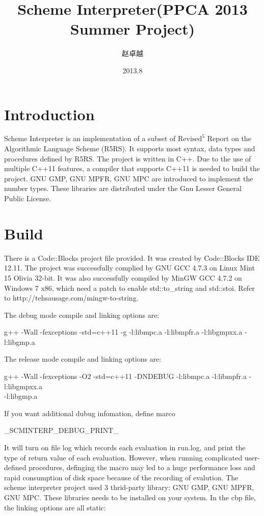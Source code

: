 \documentclass{article}
\title{Scheme Interpreter(PPCA 2013 Summer Project)}
\author{赵卓越}
\date{2013.8}
\begin{document}
\maketitle

\tableofcontents

\newpage

\section{Introduction}
Scheme Interpreter is an implementation of a subset of $\textrm{Revised}^5$ Report on the Algorithmic Language Scheme (R5RS). It supports most syntax, data types and procedures defined by R5RS. The project is written in C++. Due to the use of multiple C++11 features, a compiler that supports C++11 is needed to build the project. GNU GMP, GNU MPFR, GNU MPC are introduced to implement the number types. These libraries are distributed under the Gnu Lesser General Public License.

\section{Build}
There is a Code::Blocks project file provided. It was created by Code::Blocks IDE 12.11.
The project was successfully complied by GNU GCC 4.7.3 on Linux Mint 15 Olivia 32-bit. It was also successfully compiled by MinGW GCC 4.7.2 on Windows 7 x86, which need a patch to enable std::to\_string and std::stoi. Refer to http://tehsausage.com/mingw-to-string.

\noindent
The debug mode compile and linking options are:
	
	g++ -Wall -fexceptions -std=c++11 -g  -l:libmpc.a -l:libmpfr.a -l:libgmpxx.a -l:libgmp.a

\noindent
The release mode compile and linking options are:
		
	g++ -Wall -fexceptions -O2 -std=c++11 -DNDEBUG  -l:libmpc.a -l:libmpfr.a -l:libgmpxx.a \\ \quad -l:libgmp.a

\noindent
If you want additional dubug infomation, define marco

	\_SCMINTERP\_DEBUG\_PRINT\_

It will turn on file log which records each evaluation in run.log, and
print the type of return value of each evaluation. However, when running complicated
user-defined procedures, definging the macro may led to a huge performance loss and
rapid consumption of disk space because of the recording of evalution.
The scheme interpreter project used 3 thrid-party library: GNU GMP, GNU MPFR, GNU MPC.
These libraries needs to be installed on your system. In the cbp file, the linking
options are all static:
\end{document}
